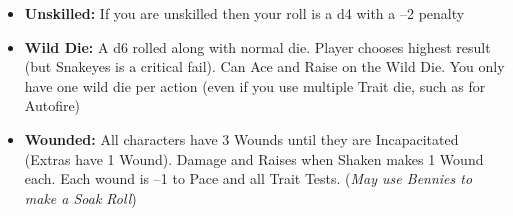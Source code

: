 \begin{itemize}
\begin{redtable}{\linewidth}{sb}
      Heavy cover & +4\\
    \end{redtable}
  \item \textbf{Unskilled:} If you are unskilled then your roll is a d4 with a –2 penalty
  \item \textbf{Wild Die:} A d6 rolled along with normal die. Player chooses highest result (but Snakeyes is a critical fail). Can Ace and Raise on the Wild Die. You only have one wild die per action (even if you use multiple Trait die, such as for Autofire)
  \item \textbf{Wounded:} All characters have 3 Wounds until they are Incapacitated (Extras have 1 Wound). Damage and Raises when Shaken makes 1 Wound each. Each wound is –1 to Pace and all Trait Tests. (\textit{May use Bennies to make a Soak Roll})
\end{itemize}
